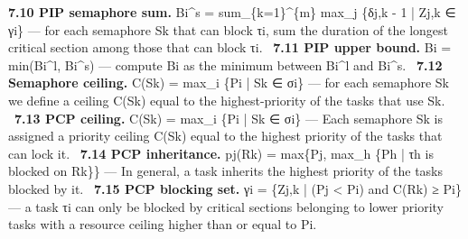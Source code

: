 \documentclass[conference]{IEEEtran}
\begin{document}
\textbf{7.10 PIP semaphore sum.} Bi\textasciicircum{}s = sum\_\{k=1\}\textasciicircum{}\{m\} max\_j \{δj,k - 1 | Zj,k ∈ γi\} --- for each semaphore Sk that can block τi, sum the duration of the longest critical section among those that can block τi. \cite{Buttazzo2011}\
\textbf{7.11 PIP upper bound.} Bi = min(Bi\textasciicircum{}l, Bi\textasciicircum{}s) --- compute Bi as the minimum between Bi\textasciicircum{}l and Bi\textasciicircum{}s. \cite{Buttazzo2011}\
\textbf{7.12 Semaphore ceiling.} C(Sk) = max\_i \{Pi | Sk ∈ σi\} --- for each semaphore Sk we define a ceiling C(Sk) equal to the highest-priority of the tasks that use Sk. \cite{Buttazzo2011}\
\textbf{7.13 PCP ceiling.} C(Sk) = max\_i \{Pi | Sk ∈ σi\} --- Each semaphore Sk is assigned a priority ceiling C(Sk) equal to the highest priority of the tasks that can lock it. \cite{Buttazzo2011}\
\textbf{7.14 PCP inheritance.} pj(Rk) = max\{Pj, max\_h \{Ph | τh is blocked on Rk\}\} --- In general, a task inherits the highest priority of the tasks blocked by it. \cite{Buttazzo2011}\
\textbf{7.15 PCP blocking set.} γi = \{Zj,k | (Pj < Pi) and C(Rk) ≥ Pi\} --- a task τi can only be blocked by critical sections belonging to lower priority tasks with a resource ceiling higher than or equal to Pi. \cite{Buttazzo2011}\
\end{document}
